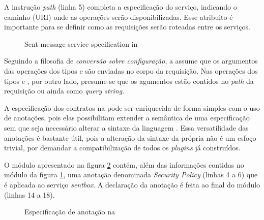 A instrução \emph{path} (linha 5) completa a especificação do serviço, indicando
o caminho (URI) onde as operações serão disponibilizadas. Esse atribuito é importante para se definir
como as requisições serão roteadas entre os serviços.

\vspace{6mm}

\begin{figure}[htb]
\begin{small}

\end{small}
\caption{Sent message service specification in \neoidl}
\label{lst:sentmessage-neo}
\end{figure}

Seguindo a filosofia de \emph{conversão sobre configuração}, a \neoidl{} assume
que os argumentos das operações dos tipos  e  são
enviadas no corpo da requisição. Nas operações dos tipos  e
, por outro lado, presume-se que os agumentos estão contidos no \emph{path} da requisição ou ainda
como \textit{query string}.

A especificação dos contratos na \neoidl{} pode ser enriquecida de forma simples
com o uso de anotações, pois elas possibilitam extender a semântica
de uma especificação sem que seja necessário alterar a sintaxe da
linguagem \neoidl{}. Essa versatilidade das anotações é bastante útil, pois a
alteração da sintaxe da própria \neoidl{} não é um esfoço trivial, por demandar
a compatibilização de todos os \textit{plugins} já construídos.

O módulo apresentado na figura \ref{lst:annotationNeoIDL} contém, além das
informações contidas no módulo da figura \ref{lst:sentmessage-neo}, uma anotação
denominada \emph{Security Policy} (linhas 4 a 6) que é aplicada ao serviço
\emph{sentbox}.
A declaração da anotação é feita ao final do módulo (linhas 14 a 18).

\vspace{6mm}
 
\begin{figure}[htb]
\begin{small}

\vspace{-.5cm}
\end{small}
\caption{Especificação de anotação na \neoidl{}}
\label{lst:annotationNeoIDL}
\end{figure}

